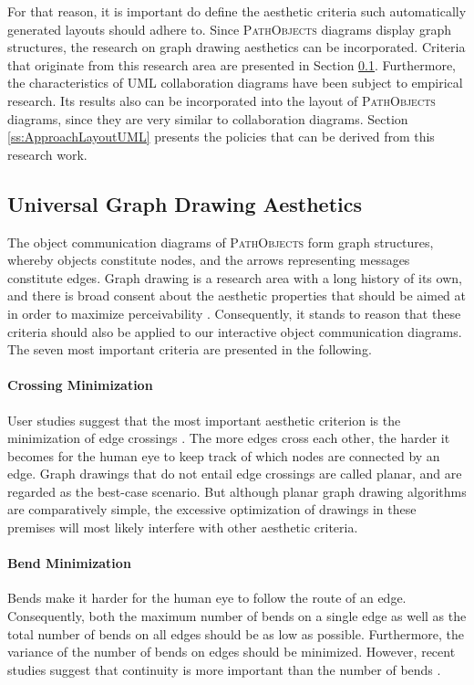 For that reason, it is important do define the aesthetic criteria such automatically generated layouts should adhere to.
Since \textsc{PathObjects} diagrams display graph structures, the research on graph drawing aesthetics can be incorporated.
Criteria that originate from this research area are presented in Section \ref{ss:ApproachLayoutUniversal}.
Furthermore, the characteristics of UML collaboration diagrams have been subject to empirical research.
Its results also can be incorporated into the layout of \textsc{PathObjects} diagrams, since they are very similar to collaboration diagrams. Section \ref{ss:ApproachLayoutUML} presents the policies that can be derived from this research work.

\subsection{Universal Graph Drawing Aesthetics}
\label{ss:ApproachLayoutUniversal}
The object communication diagrams of \textsc{PathObjects} form graph structures, whereby  objects constitute nodes, and the arrows representing messages constitute edges.
Graph drawing is a research area with a long history of its own, and there is broad consent about the aesthetic properties that should be aimed at in order to maximize perceivability \cite{battista_graph_1998, kaufmann_drawing_2001, diehl_software_2007}.
Consequently, it stands to reason that these criteria should also be applied to our interactive object communication diagrams.
The seven most important criteria are presented in the following.

\paragraph{Crossing Minimization} User studies suggest that the most important aesthetic criterion is the minimization of edge crossings \cite{purchase_effective_2000, purchase_graph_2004, purchase_graph_2010}.
The more edges cross each other, the harder it becomes for the human eye to keep track of which nodes are connected by an edge.
Graph drawings that do not entail edge crossings are called planar, and are regarded as the best-case scenario.
But although planar graph drawing algorithms are comparatively simple, the excessive optimization of drawings in these premises will most likely interfere with other aesthetic criteria.

\paragraph{Bend Minimization} Bends make it harder for the human eye to follow the route of an edge.
Consequently, both the maximum number of bends on a single edge as well as the total number of bends on all edges should be as low as possible.
Furthermore, the variance of the number of bends on edges should be minimized.
However, recent studies suggest that continuity is more important than the number of bends \cite{diehl_software_2007}.

